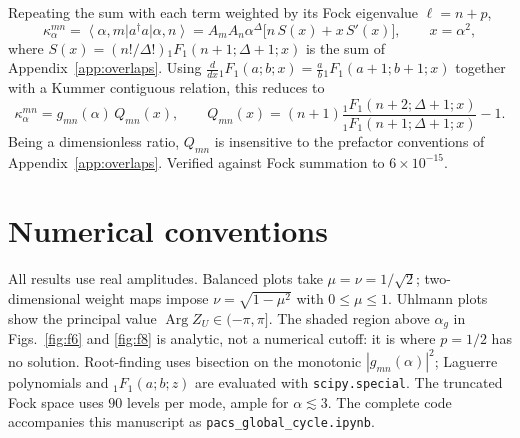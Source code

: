 \documentclass[11pt]{article}
\newcommand{\ket}[1]{\left|#1\right\rangle}
\newcommand{\bra}[1]{\left\langle#1\right|}
\newcommand{\Arg}{\operatorname{Arg}}
\newcommand{\hyp}[3]{{}_1F_1\!\left(#1;#2;#3\right)}
\begin{document}
Repeating the sum with each term weighted by its Fock eigenvalue $\ell=n+p$,
\begin{equation}
\kappa_\alpha^{mn}=\bra{\alpha,m}a^\dagger a\ket{\alpha,n}
=A_mA_n\alpha^{\Delta}\big[n\,S(x)+x\,S'(x)\big],\qquad x=\alpha^2 ,
\end{equation}
where $S(x)=(n!/\Delta!)\hyp{n+1}{\Delta+1}{x}$ is the sum of
Appendix~\ref{app:overlaps}. Using
$\frac{d}{dx}\hyp{a}{b}{x}=\frac ab\hyp{a+1}{b+1}{x}$ together with a Kummer
contiguous relation, this reduces to
\begin{equation}
\kappa_\alpha^{mn}=g_{mn}(\alpha)\,Q_{mn}(x),
\qquad
Q_{mn}(x)=(n+1)\frac{\hyp{n+2}{\Delta+1}{x}}{\hyp{n+1}{\Delta+1}{x}}-1 .
\label{eq:Qmn}
\end{equation}
Being a dimensionless ratio, $Q_{mn}$ is insensitive to the prefactor
conventions of Appendix~\ref{app:overlaps}. Verified against Fock summation to
$6\times10^{-15}$.

\section{Numerical conventions}

All results use real amplitudes. Balanced plots take $\mu=\nu=1/\sqrt2$;
two-dimensional weight maps impose $\nu=\sqrt{1-\mu^2}$ with $0\le\mu\le1$.
Uhlmann plots show the principal value $\Arg Z_U\in(-\pi,\pi]$. The shaded
region above $\alpha_g$ in Figs.~\ref{fig:f6} and \ref{fig:f8} is analytic, not
a numerical cutoff: it is where $p=1/2$ has no solution. Root-finding uses
bisection on the monotonic $|g_{mn}(\alpha)|^2$; Laguerre polynomials and
$\hyp{a}{b}{z}$ are evaluated with \texttt{scipy.special}. The truncated Fock
space uses $90$ levels per mode, ample for $\alpha\lesssim3$. The complete code
accompanies this manuscript as \texttt{pacs\_global\_cycle.ipynb}.
\end{document}
